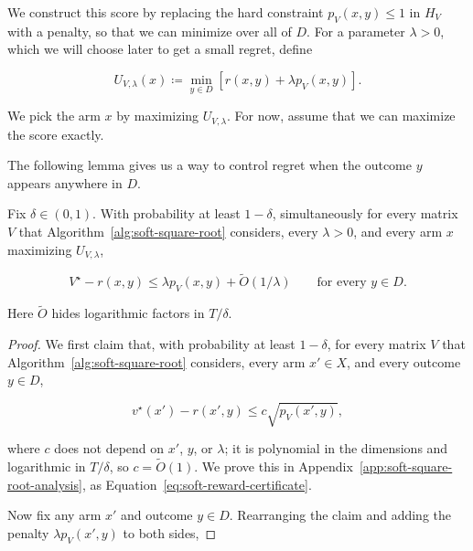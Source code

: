 {
We construct this score by replacing the hard constraint
$p_{V} \left( x , y \right) \le 1$ in $H_{V}$ with a penalty, so that we can
minimize over all of $D$. For a parameter $\lambda > 0$, which we will
choose later to get a small regret, define


\begin{equation*}
U_{V , \lambda} \left( x \right) \coloneqq \operatorname*{min}_{y \in D} \left[ r \left( x , y \right) + \lambda p_{V} \left( x , y \right) \right] .
\end{equation*}


We pick the arm $x$ by maximizing $U_{V,\lambda}$. For now, assume that we can
maximize the score exactly.

\noindent The following lemma gives us a way to control regret when the outcome $y$
appears anywhere in $D$.

\begin{lemma}\label{lem:soft-outcome-regret}
  Fix $\delta\in(0,1)$. With probability at least $1-\delta$, simultaneously
  for every matrix $V$ that Algorithm~\ref{alg:soft-square-root} considers,
  every $\lambda>0$, and every arm $x$ maximizing $U_{V,\lambda}$,

\begin{equation*}
V^\star-r(x,y)
\le \lambda p_V(x,y)+\tilde{O}(1/\lambda)
\qquad\text{for every }y\in D.
\end{equation*}

  Here $\tilde{O}$ hides logarithmic factors in $T/\delta$.

\end{lemma}

\begin{proof}
We first claim that, with probability at least $1-\delta$, for every matrix
$V$ that Algorithm~\ref{alg:soft-square-root} considers, every arm $x'\in X$,
and every outcome $y\in D$,

\begin{equation*}
v^\star(x')-r(x',y)\le c\sqrt{p_V(x',y)},
\end{equation*}

where $c$ does not depend on $x'$, $y$, or $\lambda$; it is polynomial in
the dimensions and logarithmic in $T/\delta$, so $c=\tilde{O}(1)$. We prove
this in Appendix~\ref{app:soft-square-root-analysis}, as
Equation~\ref{eq:soft-reward-certificate}.

Now fix any arm $x'$ and outcome $y\in D$. Rearranging the claim and adding
the penalty $\lambda p_V(x',y)$ to both sides,


\end{proof}}
